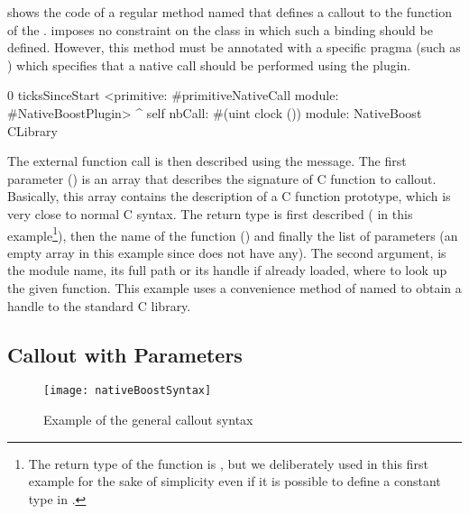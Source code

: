 shows the code of a regular \PH method named  that defines a callout to the  function of the .
\NB imposes no constraint on the class in which such a binding should be defined.
However, this method must be annotated with a specific pragma (such as ) which specifies that a native call should be performed using the \NB plugin.

\begin{stcode}[
	label={lst:ffi-clock},
	caption={\NBFFI example of callout declaration to the \ttt{clock} function of the \ttt{libc}}]{0}
ticksSinceStart
	<primitive: #primitiveNativeCall
	 module: #NativeBoostPlugin>
	^ self
		nbCall: #(uint clock ())
		module: NativeBoost CLibrary
\end{stcode}

\noindent The external function call is then described using the  message.
The first parameter () is an array that describes the signature of C function to callout.
Basically, this array contains the description of a C function prototype, which is very close to normal C syntax.
The return type is first described ( in this example\footnote{The return type of the  function is , but we deliberately used  in this first example for the sake of simplicity even if it is possible to define a constant type in \NB.}), then the name of the function () and finally the list of parameters (an empty array in this example since  does not have any).
The second argument,  is the module name, its full path or its handle if already loaded, where to look up the given function.
This example uses a convenience method of \NB named  to obtain a handle to the standard C library.

\subsection{Callout with Parameters}

\begin{figure}[H]
	\centering
	\texttt{[image: nativeBoostSyntax]}
	\caption[\NB Basic Method]{Example of the general \NBFFI callout syntax}
\end{figure}

